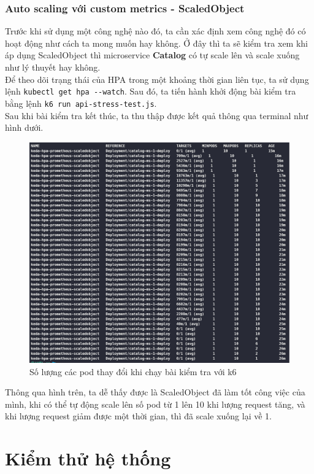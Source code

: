 \subsubsection{Auto scaling với custom metrics - ScaledObject}
\noindent Trước khi sử dụng một công nghệ nào đó, ta cần xác định xem công nghệ đó có hoạt động như cách ta mong muốn hay không. Ở đây thì ta sẽ kiểm tra xem khi áp dụng ScaledObject thì microservice \textbf{Catalog} có tự scale lên và scale xuống như lý thuyết hay không.\\[0.5cm]
Để theo dõi trạng thái của HPA trong một khoảng thời gian liên tục, ta sử dụng lệnh \lstinline|kubectl get hpa --watch|. Sau đó, ta tiến hành khởi động bài kiểm tra bằng lệnh \lstinline|k6 run api-stress-test.js|.\\[0.5cm]
Sau khi bài kiểm tra kết thúc, ta thu thập được kết quả thông qua terminal như hình dưới.
\begin{figure}[H]
  \begin{center}
    \includegraphics[scale=0.55]{images/hanh/test-with-hpa-pod-scaling.png}
    \caption{Số lượng các pod thay đổi khi chạy bài kiểm tra với k6}
  \end{center}
  \label{}
\end{figure}
Thông qua hình trên, ta dễ thấy được là ScaledObject đã làm tốt công việc của mình, khi có thể tự động scale lên số pod từ 1 lên 10 khi lượng request tăng, và khi lượng request giảm được một thời gian, thì đã scale xuống lại về 1.


\section{Kiểm thử hệ thống}
